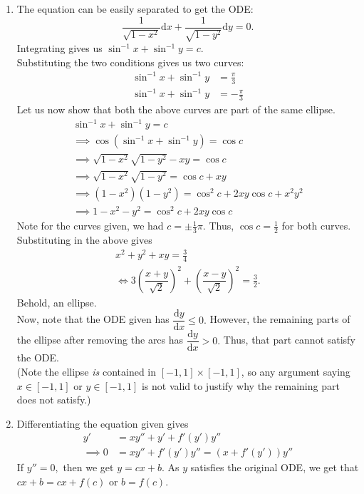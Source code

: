 \documentclass[12pt]{article}
\newcommand{\dd}{{\mathrm d}}
\begin{document}
\begin{enumerate}[label = Q.\arabic*.]
	\item The equation can be easily separated to get the ODE:
	\[\frac{1}{\sqrt{1 - x^2}}\dd x + \frac{1}{\sqrt{1 - y^2}}\dd y = 0.\]
	Integrating gives us $\sin^{-1}x + \sin^{-1}y = c.$\\
	Substituting the two conditions gives us two curves:
	\begin{align*} 
		\sin^{-1}x + \sin^{-1}y &= \frac{\pi}{3}\\
		\sin^{-1}x + \sin^{-1}y &= -\frac{\pi}{3}
	\end{align*}
	Let us now show that both the above curves are part of the same ellipse.
	\begin{align*} 
		\sin^{-1}x + \sin^{-1}y = c\\
		\implies \cos\left(\sin^{-1}x + \sin^{-1}y\right) = \cos c\\
		\implies \sqrt{1 - x^2}\sqrt{1 - y^2} - xy = \cos c\\
		\implies \sqrt{1 - x^2}\sqrt{1 - y^2} = \cos c + xy\\
		\implies (1 - x^2)(1 - y^2) = \cos^2c + 2xy\cos c + x^2y^2\\
		\implies 1 - x^2 - y^2 = \cos^2c + 2xy\cos c
	\end{align*}
	Note for the curves given, we had $c = \pm \frac{1}{3}\pi.$ Thus, $\cos c = \frac{1}{2}$ for both curves. Substituting in the above gives
	\begin{align*} 
		x^2 + y^2 + xy = \frac{3}{4}\\
		\iff 3\left(\dfrac{x + y}{\sqrt{2}}\right)^2 + \left(\dfrac{x - y}{\sqrt{2}}\right)^2 = \frac{3}{2}.
	\end{align*}
	Behold, an ellipse.\\
	Now, note that the ODE given has $\dfrac{\dd y}{\dd x} \le 0.$ However, the remaining parts of the ellipse after removing the arcs has $\dfrac{\dd y}{\dd x} > 0.$ Thus, that part cannot satisfy the ODE.\\
	(Note the ellipse \emph{is} contained in $[-1, 1] \times [-1, 1]$, so any argument saying $x \in [-1, 1]$ or $y \in [-1, 1]$ is not valid to justify why the remaining part does not satisfy.)
	\item Differentiating the equation given gives
	\begin{align*} 
		y' &= xy'' + y' + f'(y')y''\\
		\implies 0 &= xy'' + f'(y')y'' = (x + f'(y'))y''
	\end{align*}
	If $y'' = 0,$ then we get $y = cx + b.$ As $y$ satisfies the original ODE, we get that $cx + b = cx + f(c)$ or $b = f(c).$\\

\end{enumerate}
\end{document}
